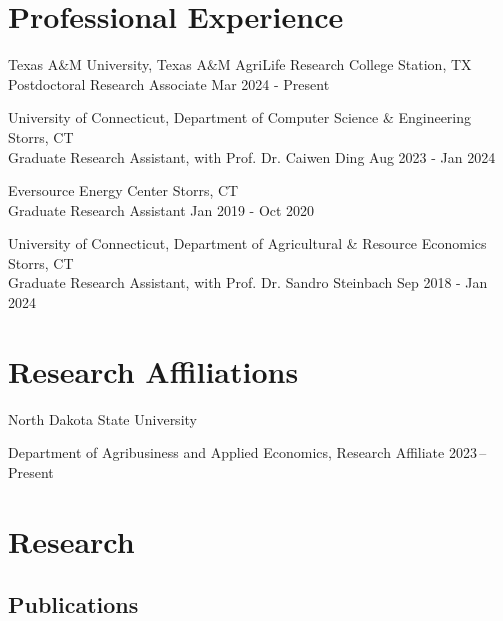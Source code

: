 \documentclass[10.5 pt,letterpaper]{article}
\renewenvironment{itemize}{
	\begin{list}{}{
			\setlength{\leftmargin}{1.5em}
		}
	}{
	\end{list}
}
\begin{document}
 \section*{\textbf{ Professional Experience}}
 \begin{itemize}
 	\item[-]  Texas A\&M University, Texas A\&M AgriLife Research  \hfill College Station, TX \\
 	Postdoctoral Research Associate   \hfill  Mar  2024  - Present
 	
 	  
 	
 	\item[-]    University of Connecticut, Department of Computer Science \& Engineering \hfill   Storrs, CT   \\  Graduate Research Assistant, with Prof. Dr. Caiwen Ding  \hfill    Aug 2023 - Jan 2024 
 	  
 	
 	\item[-]  Eversource Energy Center \hfill Storrs, CT   \\ 
 	Graduate Research Assistant   \hfill    Jan 2019 - Oct 2020
 	
 	
  	\item[-]    University of Connecticut, Department of Agricultural \& Resource Economics \hfill   Storrs, CT   \\  Graduate Research Assistant, with Prof. Dr. Sandro Steinbach  \hfill      Sep 2018 - Jan 2024
 

 
 
 \end{itemize}
 
 
	\section*{\textbf{Research  Affiliations}}
	
 
		North Dakota State University 
	\begin{itemize}
		\item[-] Department of Agribusiness and Applied Economics, Research Affiliate	\hfill    2023\,--\,  Present
	\end{itemize}
 
	 
 
	
	\section*{\textbf{Research}}
	
		\subsection*{\textbf{Publications}}
		
\end{document}
